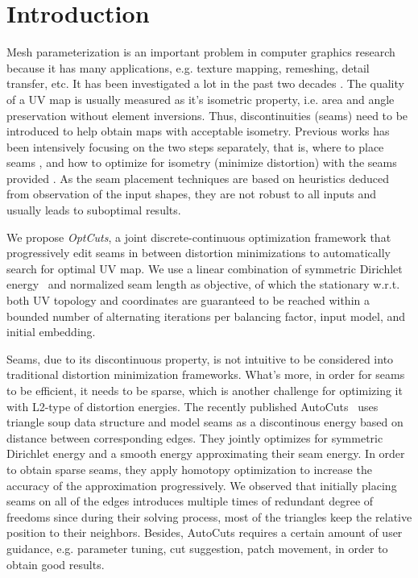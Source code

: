 \section{Introduction}

Mesh parameterization is an important problem in computer graphics research because it has many applications, e.g. texture mapping, remeshing, detail transfer, etc. It has been investigated a lot in the past two decades \cite{some mesh parameterization papers}. The quality of a UV map is usually measured as it's isometric property, i.e. area and angle preservation without element inversions. Thus, discontinuities (seams) need to be introduced to help obtain maps with acceptable isometry. Previous works has been intensively focusing on the two steps separately, that is, where to place seams \cite{some seam placement papers}, and how to optimize for isometry (minimize distortion) with the seams provided \cite{some distortion minimization papers}. As the seam placement techniques are based on heuristics deduced from observation of the input shapes, they are not robust to all inputs and usually leads to suboptimal results.

We propose {\em OptCuts}, a joint discrete-continuous optimization framework that progressively edit seams in between distortion minimizations to automatically search for optimal UV map. We use a linear combination of symmetric Dirichlet energy~\cite{Smith2015Bijective} and normalized seam length as objective, of which the stationary w.r.t. both UV topology and coordinates are guaranteed to be reached within a bounded number of alternating iterations per balancing factor, input model, and initial embedding.


Seams, due to its discontinuous property, is not intuitive to be considered into traditional distortion minimization frameworks. What's more, in order for seams to be efficient, it needs to be sparse, which is another challenge for optimizing it with L2-type of distortion energies. The recently published AutoCuts~\cite{Poranne2017Autocuts} uses triangle soup data structure and model seams as a discontinous energy based on distance between corresponding edges. They jointly optimizes for symmetric Dirichlet energy and a smooth energy approximating their seam energy. In order to obtain sparse seams, they apply homotopy optimization to increase the accuracy of the approximation progressively. We observed that initially placing seams on all of the edges introduces multiple times of redundant degree of freedoms since during their solving process, most of the triangles keep the relative position to their neighbors. Besides, AutoCuts requires a certain amount of user guidance, e.g. parameter tuning, cut suggestion, patch movement, in order to obtain good results.

